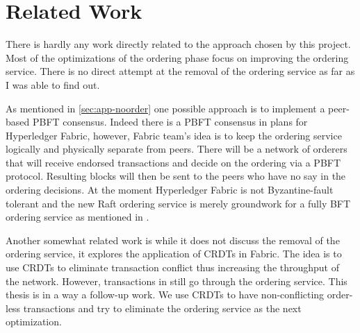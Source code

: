 \chapter{Related Work}
\label{chapter:relatedWork}

There is hardly any work directly related to the approach chosen by this project. Most of the optimizations of the ordering phase focus on improving the ordering service. There is no direct attempt at the removal of the ordering service as far as I was able to find out.

As mentioned in \ref{sec:app-noorder} one possible approach is to implement a peer-based PBFT consensus. Indeed there is a PBFT consensus in plans for Hyperledger Fabric, however, Fabric team's idea is to keep the ordering service logically and physically separate from peers. There will be a network of orderers that will receive endorsed transactions and decide on the ordering via a PBFT protocol. Resulting blocks will then be sent to the peers who have no say in the ordering decisions. At the moment Hyperledger Fabric is not Byzantine-fault tolerant and the new Raft ordering service is merely groundwork for a fully BFT ordering service as mentioned in \cite{fabricdocs:orderer}.

Another somewhat related work is \cite{lit:fabriccrdt} while it does not discuss the removal of the ordering service, it explores the application of CRDTs in Fabric. The idea is to use CRDTs to eliminate transaction conflict thus increasing the throughput of the network. However, transactions in \cite{lit:fabriccrdt} still go through the ordering service. This thesis is in a way a follow-up work. We use CRDTs to have non-conflicting order-less transactions and try to eliminate the ordering service as the next optimization.

